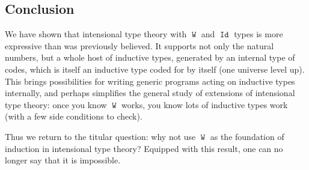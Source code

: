 \documentclass[a4paper,UKenglish,cleveref,nameinlink,autoref,thm-restate]{lipics-v2019}
\DeclareMathOperator{\W}{\mathtt{W}}
\DeclareMathOperator{\Idop}{\mathtt{Id}}
\begin{document}
\subsection{Conclusion}

We have shown that intensional type theory with $\W$ and $\Idop$ types is more expressive than was previously believed. It supports not only the natural numbers, but a whole host of inductive types, generated by an internal type of codes, which is itself an inductive type coded for by itself (one universe level up). This brings possibilities for writing generic programs acting on inductive types internally, and perhaps simplifies the general study of extensions of intensional type theory: once you know $\W$ works, you know lots of inductive types work (with a few side conditions to check).

Thus we return to the titular question: why not use $\W$ as the foundation of induction in intensional type theory? Equipped with this result, one can no longer say that it is impossible.





\appendix
\end{document}
